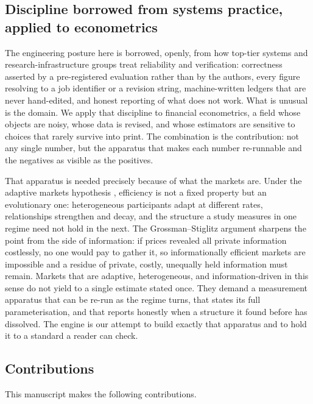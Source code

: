 \subsection{Discipline borrowed from systems practice, applied to econometrics}

The engineering posture here is borrowed, openly, from how top-tier systems and
research-infrastructure groups treat reliability and verification: correctness
asserted by a pre-registered evaluation rather than by the authors, every figure
resolving to a job identifier or a revision string, machine-written ledgers that
are never hand-edited, and honest reporting of what does not work. What is
unusual is the domain. We apply that discipline to financial econometrics, a
field whose objects are noisy, whose data is revised, and whose estimators are
sensitive to choices that rarely survive into print. The combination is the
contribution: not any single number, but the apparatus that makes each number
re-runnable and the negatives as visible as the positives.

That apparatus is needed precisely because of what the markets are. Under the
adaptive markets hypothesis \citep{lo2004}, efficiency is not a fixed property
but an evolutionary one: heterogeneous participants adapt at different rates,
relationships strengthen and decay, and the structure a study measures in one
regime need not hold in the next. The Grossman--Stiglitz argument
\citep{grossman1980} sharpens the point from the side of information: if prices
revealed all private information costlessly, no one would pay to gather it, so
informationally efficient markets are impossible and a residue of private,
costly, unequally held information must remain. Markets that are adaptive,
heterogeneous, and information-driven in this sense do not yield to a single
estimate stated once. They demand a measurement apparatus that can be re-run as
the regime turns, that states its full parameterisation, and that reports
honestly when a structure it found before has dissolved. The engine is our
attempt to build exactly that apparatus and to hold it to a standard a reader can
check.

\subsection{Contributions}

This manuscript makes the following contributions.

